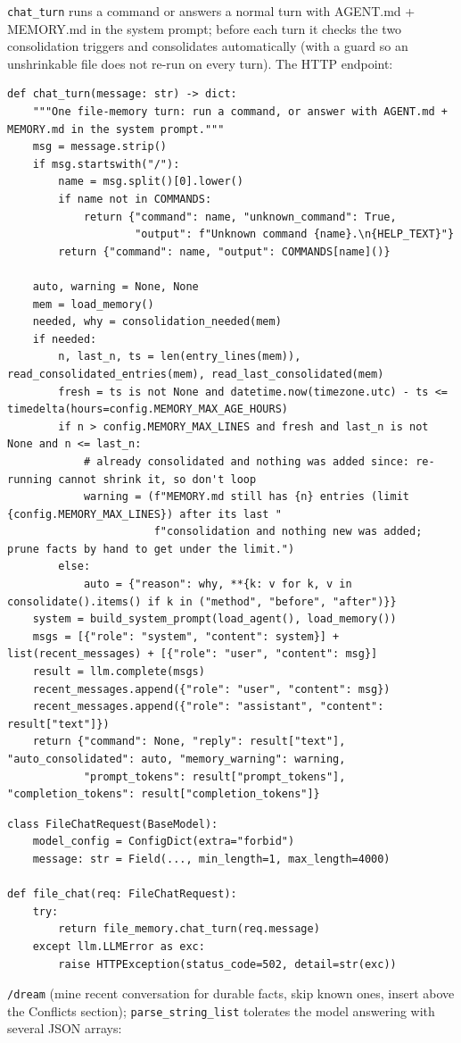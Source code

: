 \documentclass[11pt]{article}
\begin{document}
\endgroup
\verb|chat_turn| runs a command or answers a normal turn with AGENT.md + MEMORY.md in the system prompt; before each turn it checks the two consolidation triggers and consolidates automatically (with a guard so an unshrinkable file does not re-run on every turn). The HTTP endpoint:

\begingroup\lstset{basicstyle=\ttfamily\scriptsize}
\begin{lstlisting}
def chat_turn(message: str) -> dict:
    """One file-memory turn: run a command, or answer with AGENT.md + MEMORY.md in the system prompt."""
    msg = message.strip()
    if msg.startswith("/"):
        name = msg.split()[0].lower()
        if name not in COMMANDS:
            return {"command": name, "unknown_command": True,
                    "output": f"Unknown command {name}.\n{HELP_TEXT}"}
        return {"command": name, "output": COMMANDS[name]()}

    auto, warning = None, None
    mem = load_memory()
    needed, why = consolidation_needed(mem)
    if needed:
        n, last_n, ts = len(entry_lines(mem)), read_consolidated_entries(mem), read_last_consolidated(mem)
        fresh = ts is not None and datetime.now(timezone.utc) - ts <= timedelta(hours=config.MEMORY_MAX_AGE_HOURS)
        if n > config.MEMORY_MAX_LINES and fresh and last_n is not None and n <= last_n:
            # already consolidated and nothing was added since: re-running cannot shrink it, so don't loop
            warning = (f"MEMORY.md still has {n} entries (limit {config.MEMORY_MAX_LINES}) after its last "
                       f"consolidation and nothing new was added; prune facts by hand to get under the limit.")
        else:
            auto = {"reason": why, **{k: v for k, v in consolidate().items() if k in ("method", "before", "after")}}
    system = build_system_prompt(load_agent(), load_memory())
    msgs = [{"role": "system", "content": system}] + list(recent_messages) + [{"role": "user", "content": msg}]
    result = llm.complete(msgs)
    recent_messages.append({"role": "user", "content": msg})
    recent_messages.append({"role": "assistant", "content": result["text"]})
    return {"command": None, "reply": result["text"], "auto_consolidated": auto, "memory_warning": warning,
            "prompt_tokens": result["prompt_tokens"], "completion_tokens": result["completion_tokens"]}
\end{lstlisting}
\endgroup
\begingroup\lstset{basicstyle=\ttfamily\scriptsize}
\begin{lstlisting}
class FileChatRequest(BaseModel):
    model_config = ConfigDict(extra="forbid")
    message: str = Field(..., min_length=1, max_length=4000)

def file_chat(req: FileChatRequest):
    try:
        return file_memory.chat_turn(req.message)
    except llm.LLMError as exc:
        raise HTTPException(status_code=502, detail=str(exc))
\end{lstlisting}
\endgroup
\verb|/dream| (mine recent conversation for durable facts, skip known ones, insert above the Conflicts section); \verb|parse_string_list| tolerates the model answering with several JSON arrays:
\end{document}
